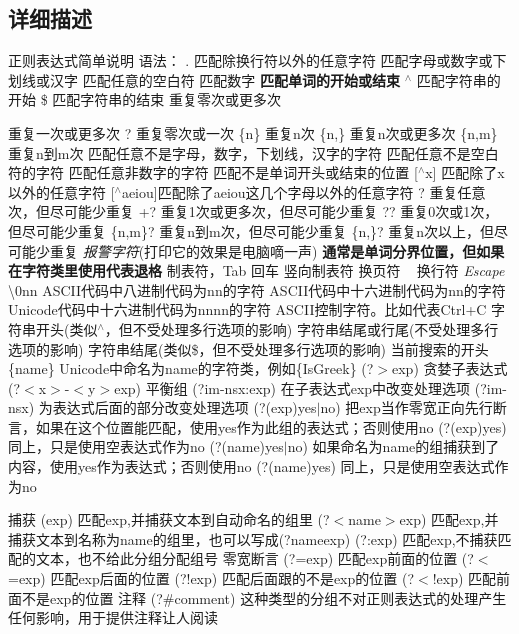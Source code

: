 \subsection{详细描述}
正则表达式简单说明 语法： . 匹配除换行符以外的任意字符  匹配字母或数字或下划线或汉字  匹配任意的空白符  匹配数字 {\bfseries 匹配单词的开始或结束} $^\wedge$ 匹配字符串的开始 \$ 匹配字符串的结束 重复零次或更多次
\begin{DoxyItemize}
\item 重复一次或更多次 ? 重复零次或一次 \{n\} 重复n次 \{n,\} 重复n次或更多次 \{n,m\} 重复n到m次  匹配任意不是字母，数字，下划线，汉字的字符  匹配任意不是空白符的字符  匹配任意非数字的字符  匹配不是单词开头或结束的位置 \mbox{[}$^\wedge$x\mbox{]} 匹配除了x以外的任意字符 \mbox{[}$^\wedge$aeiou\mbox{]}匹配除了aeiou这几个字母以外的任意字符 ? 重复任意次，但尽可能少重复 +? 重复1次或更多次，但尽可能少重复 ?? 重复0次或1次，但尽可能少重复 \{n,m\}? 重复n到m次，但尽可能少重复 \{n,\}? 重复n次以上，但尽可能少重复 {\itshape 报警字符}(打印它的效果是电脑嘀一声) {\bfseries 通常是单词分界位置，但如果在字符类里使用代表退格}  制表符，\+Tab  回车  竖向制表符  换页符 ~\newline
 换行符 {\itshape Escape} \textbackslash{}0nn A\+S\+C\+I\+I代码中八进制代码为nn的字符  A\+S\+C\+I\+I代码中十六进制代码为nn的字符  Unicode代码中十六进制代码为nnnn的字符  A\+S\+C\+I\+I控制字符。比如代表\+Ctrl+C  字符串开头(类似$^\wedge$，但不受处理多行选项的影响)  字符串结尾或行尾(不受处理多行选项的影响)  字符串结尾(类似\$，但不受处理多行选项的影响)  当前搜索的开头 {\ttfamily }\{name\} Unicode中命名为name的字符类，例如{\ttfamily }\{Is\+Greek\} (?$>$exp) 贪婪子表达式 (?$<$x$>$-\/$<$y$>$exp) 平衡组 (?im-\/nsx\+:exp) 在子表达式exp中改变处理选项 (?im-\/nsx) 为表达式后面的部分改变处理选项 (?(exp)yes$\vert$no) 把exp当作零宽正向先行断言，如果在这个位置能匹配，使用yes作为此组的表达式；否则使用no (?(exp)yes) 同上，只是使用空表达式作为no (?(name)yes$\vert$no) 如果命名为name的组捕获到了内容，使用yes作为表达式；否则使用no (?(name)yes) 同上，只是使用空表达式作为no
\end{DoxyItemize}

捕获 (exp) 匹配exp,并捕获文本到自动命名的组里 (?$<$name$>$exp) 匹配exp,并捕获文本到名称为name的组里，也可以写成(?\textquotesingle{}name\textquotesingle{}exp) (?\+:exp) 匹配exp,不捕获匹配的文本，也不给此分组分配组号 零宽断言 (?=exp) 匹配exp前面的位置 (?$<$=exp) 匹配exp后面的位置 (?!exp) 匹配后面跟的不是exp的位置 (?$<$!exp) 匹配前面不是exp的位置 注释 (?\#comment) 这种类型的分组不对正则表达式的处理产生任何影响，用于提供注释让人阅读

